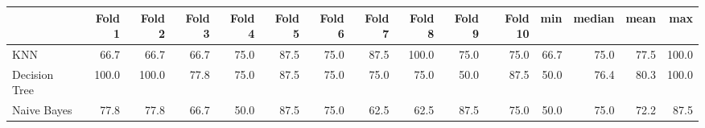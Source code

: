 \begin{tabular}{lrrrrrrrrrrrrrr}
\toprule
{} & Fold 1 & Fold 2 & Fold 3 & Fold 4 & Fold 5 & Fold 6 & Fold 7 & Fold 8 & Fold 9 & Fold 10 &   min & median &  mean &    max \\
\midrule
KNN           & 66.7 & 66.7 & 66.7 & 75.0 & 87.5 & 75.0 & 87.5 & 100.0 & 75.0 & 75.0 & 66.7 & 75.0 & 77.5 & 100.0 \\
Decision Tree & 100.0 & 100.0 & 77.8 & 75.0 & 87.5 & 75.0 & 75.0 & 75.0 & 50.0 & 87.5 & 50.0 & 76.4 & 80.3 & 100.0 \\
Naive Bayes   & 77.8 & 77.8 & 66.7 & 50.0 & 87.5 & 75.0 & 62.5 & 62.5 & 87.5 & 75.0 & 50.0 & 75.0 & 72.2 &  87.5 \\
\bottomrule
\end{tabular}

